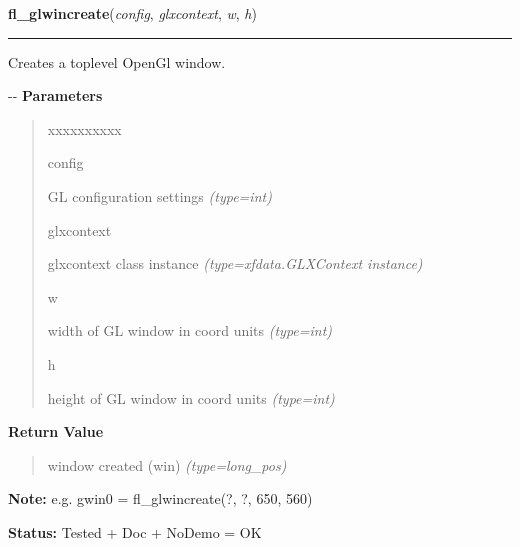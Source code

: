 \hspace{.8\funcindent}\begin{boxedminipage}{\funcwidth}

    \raggedright \textbf{fl\_glwincreate}(\textit{config}, \textit{glxcontext}, \textit{w}, \textit{h})

    \vspace{-1.5ex}

    \rule{\textwidth}{0.5\fboxrule}
\setlength{\parskip}{2ex}

Creates a toplevel OpenGl window.

-{}-
\setlength{\parskip}{1ex}
      \textbf{Parameters}
      \vspace{-1ex}

      \begin{quote}
        \begin{Ventry}{xxxxxxxxxx}

          \item[config]


GL configuration settings
            {\it (type=int)}

          \item[glxcontext]


glxcontext class instance
            {\it (type=xfdata.GLXContext instance)}

          \item[w]


width of GL window in coord units
            {\it (type=int)}

          \item[h]


height of GL window in coord units
            {\it (type=int)}

        \end{Ventry}

      \end{quote}

      \textbf{Return Value}
    \vspace{-1ex}

      \begin{quote}

window created (win)
      {\it (type=long\_pos)}

      \end{quote}

\textbf{Note:} 
e.g. gwin0 = fl\_glwincreate(?, ?, 650, 560)


\textbf{Status:} 
Tested + Doc + NoDemo = OK


    \end{boxedminipage}

